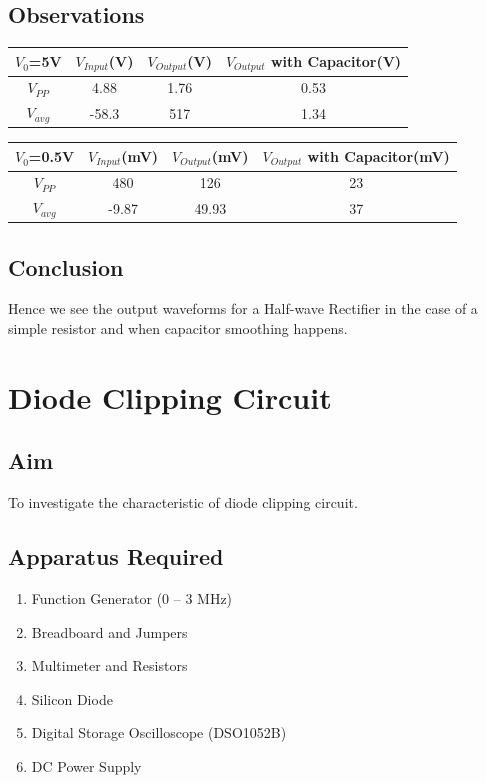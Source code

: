 \documentclass{article}
\begin{document}
\subsection{Observations}
\begin{center}
\begin{tabular}{|c|c|c|c|}
\hline
    $V_{0}$=5V & $V_{Input}$(V) & $V_{Output}$(V) & $V_{Output}$ with Capacitor(V) \\
    \hline
    $V_{PP}$ & 4.88 & 1.76 & 0.53\\
    $V_{avg}$ & -58.3 & 517 & 1.34 \\
\hline
\end{tabular}\vspace{3mm}
\begin{tabular}{|c|c|c|c|}
\hline
    $V_{0}$=0.5V & $V_{Input}$(mV) & $V_{Output}$(mV) & $V_{Output}$ with Capacitor(mV) \\
    \hline
    $V_{PP}$ & 480 & 126 & 23\\
    $V_{avg}$ & -9.87 & 49.93 & 37 \\
\hline
\end{tabular}
\end{center}
\subsection{Conclusion}
Hence we see the output waveforms for a Half-wave Rectifier in the case of a simple resistor and when capacitor smoothing happens.
\newpage
\section{Diode Clipping Circuit}
\subsection{Aim}
To investigate the characteristic of diode clipping circuit.
\subsection{Apparatus Required}
\begin{enumerate}
    \item Function Generator (0 – 3 MHz)
    \item Breadboard and Jumpers
    \item Multimeter and Resistors
    \item Silicon Diode
    \item Digital Storage Oscilloscope (DSO1052B)
    \item DC Power Supply
\end{enumerate}
\end{document}
